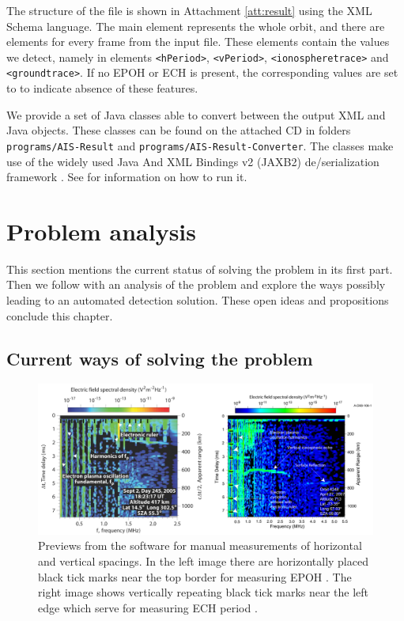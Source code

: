 The structure of the file is shown in Attachment \ref{att:result} using the XML Schema language. The main element represents the whole orbit, and there are elements for every frame from the input file. These elements contain the values we detect, namely in elements \texttt{<hPeriod>}, \texttt{<vPeriod>}, \texttt{<ionospheretrace>} and \texttt{<groundtrace>}. If no EPOH or ECH is present, the corresponding values are set to  to indicate absence of these features.

We provide a set of Java classes able to convert between the output XML and Java objects. These classes can be found on the attached CD in folders \texttt{programs/AIS-Result} and \texttt{programs/AIS-Result-Converter}. The classes make use of the widely used Java And XML Bindings v2 (JAXB2) de/serialization framework \citep{Java.net2013}. See  for information on how to run it.

\section{Problem analysis}
This section mentions the current status of solving the problem in its first part. Then we follow with an analysis of the problem and explore the ways possibly leading to an automated detection solution. These open ideas and propositions conclude this chapter.

\subsection{Current ways of solving the problem}  

\begin{figure}
	\centering
	\includegraphics[width=140mm]{images/rulers.png}
	\caption{Previews from the software for manual measurements of horizontal and vertical spacings. In the left image there are horizontally placed black tick marks near the top border for measuring EPOH \citep{Duru2008}. The right image shows vertically repeating black tick marks near the left edge which serve for measuring ECH period \citep{Akalin2010}.}
	\label{fig:rulers}
\end{figure}

